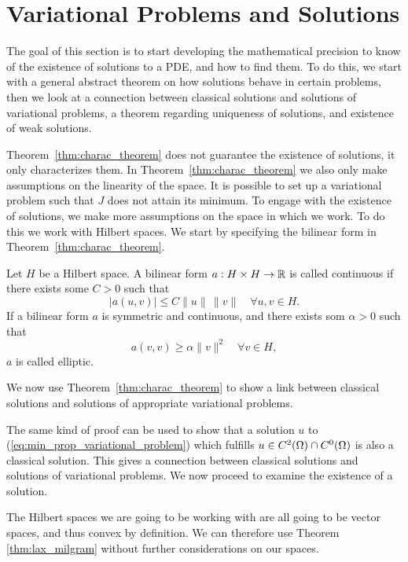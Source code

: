 \section{Variational Problems and Solutions}
The goal of this section is to start developing the mathematical 
precision to know of the existence of solutions to a PDE, and how to find 
them. 
To do this, we start with a general abstract theorem on how solutions 
behave in certain problems, then we look at a connection between 
classical solutions and solutions of variational problems, a 
theorem regarding uniqueness of solutions, and existence of 
weak solutions.


Theorem~\ref{thm:charac_theorem} does not guarantee the existence 
of solutions, it only characterizes them. In Theorem~\ref{thm:charac_theorem} we 
also only make assumptions on the linearity of the space. 
It is possible to set up a variational problem such that $J$ does 
not attain its minimum.
To engage with the existence of solutions, we make more assumptions on 
the space in which we work. To do this we work with Hilbert spaces. 
We start by specifying the bilinear form in Theorem~\ref{thm:charac_theorem}.
\begin{defn}{\quad}
   Let $H$ be a Hilbert space. A bilinear form $a : H \times H \to \mathbb{R}$ is 
   called continuous if there exists some $C > 0$ such that 
   \begin{equation}
    |a(u,v)| \leq C \|u\|\, \|v\| \quad \forall u,v \in H.
   \end{equation} 
   If a bilinear form $a$ is symmetric and continuous, and there exists som $\alpha >0$ such that 
   \begin{equation*}
    a(v,v) \geq \alpha \|v\|^2 \quad \forall v \in H,
   \end{equation*}
   $a$ is called elliptic.
 \end{defn}
We now use Theorem~\ref{thm:charac_theorem} to show a link between classical 
solutions and solutions of appropriate variational problems.

The same kind of proof can be used to show that a solution $u$ to 
(\ref{eq:min_prop_variational_problem}) which fulfills 
$u\in C^2(\Omega) \cap C^0(\Omega)$ is also a classical solution. 
This gives a connection between classical solutions and solutions of 
variational problems. We now proceed to examine the existence of a 
solution.

The Hilbert spaces we are going to be working with are all going to be 
vector spaces, and thus convex by definition. 
We can therefore use Theorem \ref{thm:lax_milgram} without further considerations 
on our spaces.


